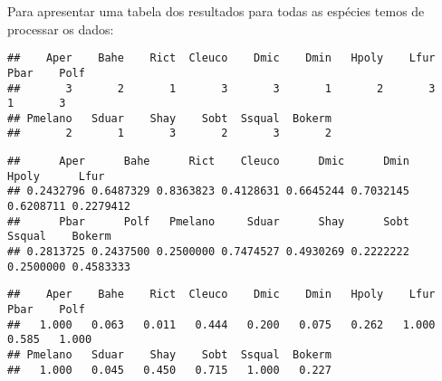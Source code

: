 \documentclass[
]{book}
\newenvironment{Shaded}{\begin{snugshade}}{\end{snugshade}}
\newcommand{\KeywordTok}[1]{\textcolor[rgb]{0.13,0.29,0.53}{\textbf{#1}}}
\newcommand{\NormalTok}[1]{#1}
\newcommand{\OperatorTok}[1]{\textcolor[rgb]{0.81,0.36,0.00}{\textbf{#1}}}
\newcommand{\StringTok}[1]{\textcolor[rgb]{0.31,0.60,0.02}{#1}}
\begin{document}
Para apresentar uma tabela dos resultados para todas as espécies temos de processar os dados:

\begin{Shaded}
\end{Shaded}

\begin{verbatim}
##    Aper    Bahe    Rict  Cleuco    Dmic    Dmin   Hpoly    Lfur    Pbar    Polf 
##       3       2       1       3       3       1       2       3       1       3 
## Pmelano   Sduar    Shay    Sobt  Ssqual  Bokerm 
##       2       1       3       2       3       2
\end{verbatim}

\begin{Shaded}
\end{Shaded}

\begin{verbatim}
##      Aper      Bahe      Rict    Cleuco      Dmic      Dmin     Hpoly      Lfur 
## 0.2432796 0.6487329 0.8363823 0.4128631 0.6645244 0.7032145 0.6208711 0.2279412 
##      Pbar      Polf   Pmelano     Sduar      Shay      Sobt    Ssqual    Bokerm 
## 0.2813725 0.2437500 0.2500000 0.7474527 0.4930269 0.2222222 0.2500000 0.4583333
\end{verbatim}

\begin{Shaded}
\end{Shaded}

\begin{verbatim}
##    Aper    Bahe    Rict  Cleuco    Dmic    Dmin   Hpoly    Lfur    Pbar    Polf 
##   1.000   0.063   0.011   0.444   0.200   0.075   0.262   1.000   0.585   1.000 
## Pmelano   Sduar    Shay    Sobt  Ssqual  Bokerm 
##   1.000   0.045   0.450   0.715   1.000   0.227
\end{verbatim}

\begin{Shaded}
\end{Shaded}
\end{document}
